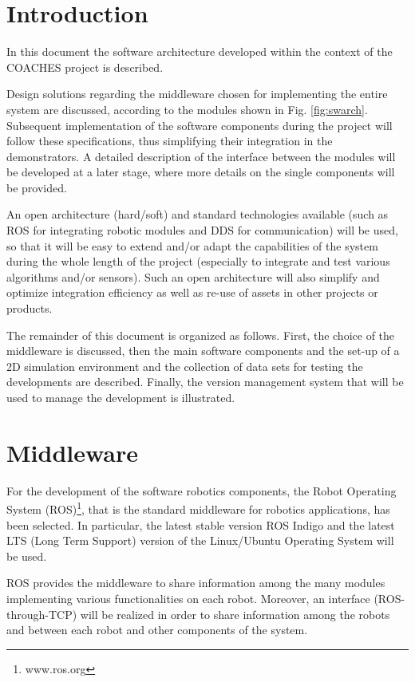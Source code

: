 \documentclass{article}
\begin{document}
\section{Introduction}

In this document the software architecture developed within the
context of the COACHES project is described.

Design solutions regarding the middleware chosen for implementing the entire system are discussed,
according to the modules shown in Fig. \ref{fig:swarch}.
Subsequent implementation of the software components during the project will follow  these  specifications,  thus  simplifying  their  integration  in  the demonstrators. 
A detailed description of the interface between the modules will be developed at a later stage, where more details on the single components will be provided.


An open architecture (hard/soft) and standard technologies available (such 
as ROS for integrating robotic modules and DDS for communication) will be used,
so that it will be 
easy to extend and/or adapt the capabilities of the system during the whole length of 
the  project  (especially  to  integrate  and  test  various  algorithms  and/or  sensors).  Such 
an open architecture will also simplify and optimize integration efficiency as well as re-use of assets in other projects or products. 

The remainder of this document is organized as follows.
First, the choice of the middleware is discussed, then the main software components and the
set-up of a 2D simulation environment and the collection of data sets for testing the developments are described.
Finally, the version management system that will be used to manage the development is illustrated.

\section{Middleware}

For the development of the software robotics components, the Robot Operating System (ROS)\footnote{www.ros.org}, that is the standard middleware for robotics applications, has been selected.
In particular, the latest stable version ROS Indigo and the latest LTS (Long Term Support) version of the Linux/Ubuntu Operating System will be used.

ROS provides the middleware to share information among the many modules implementing various functionalities on each robot. Moreover, an interface (ROS-through-TCP) will be realized in order to share information among the robots and between each robot and other components of the system.
\end{document}
